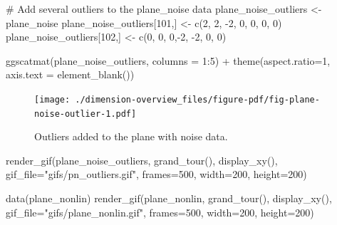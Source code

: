 \documentclass[
  letterpaper,
]{book}
\newenvironment{Shaded}{\begin{snugshade}}{\end{snugshade}}
\newcommand{\AttributeTok}[1]{\textcolor[rgb]{0.40,0.45,0.13}{#1}}
\newcommand{\CommentTok}[1]{\textcolor[rgb]{0.37,0.37,0.37}{#1}}
\newcommand{\DecValTok}[1]{\textcolor[rgb]{0.68,0.00,0.00}{#1}}
\newcommand{\FunctionTok}[1]{\textcolor[rgb]{0.28,0.35,0.67}{#1}}
\newcommand{\NormalTok}[1]{\textcolor[rgb]{0.00,0.23,0.31}{#1}}
\newcommand{\OtherTok}[1]{\textcolor[rgb]{0.00,0.23,0.31}{#1}}
\newcommand{\SpecialCharTok}[1]{\textcolor[rgb]{0.37,0.37,0.37}{#1}}
\newcommand{\StringTok}[1]{\textcolor[rgb]{0.13,0.47,0.30}{#1}}
\begin{document}
\begin{Shaded}
\begin{Highlighting}[]
\CommentTok{\# Add several outliers to the plane\_noise data}
\NormalTok{plane\_noise\_outliers }\OtherTok{\textless{}{-}}\NormalTok{ plane\_noise}
\NormalTok{plane\_noise\_outliers[}\DecValTok{101}\NormalTok{,] }\OtherTok{\textless{}{-}} \FunctionTok{c}\NormalTok{(}\DecValTok{2}\NormalTok{, }\DecValTok{2}\NormalTok{, }\SpecialCharTok{{-}}\DecValTok{2}\NormalTok{, }\DecValTok{0}\NormalTok{, }\DecValTok{0}\NormalTok{, }\DecValTok{0}\NormalTok{, }\DecValTok{0}\NormalTok{)}
\NormalTok{plane\_noise\_outliers[}\DecValTok{102}\NormalTok{,] }\OtherTok{\textless{}{-}} \FunctionTok{c}\NormalTok{(}\DecValTok{0}\NormalTok{, }\DecValTok{0}\NormalTok{, }\DecValTok{0}\NormalTok{,}\SpecialCharTok{{-}}\DecValTok{2}\NormalTok{, }\SpecialCharTok{{-}}\DecValTok{2}\NormalTok{, }\DecValTok{0}\NormalTok{, }\DecValTok{0}\NormalTok{)}

\FunctionTok{ggscatmat}\NormalTok{(plane\_noise\_outliers, }\AttributeTok{columns =} \DecValTok{1}\SpecialCharTok{:}\DecValTok{5}\NormalTok{) }\SpecialCharTok{+}
  \FunctionTok{theme}\NormalTok{(}\AttributeTok{aspect.ratio=}\DecValTok{1}\NormalTok{, }\AttributeTok{axis.text =} \FunctionTok{element\_blank}\NormalTok{())}
\end{Highlighting}
\end{Shaded}

\begin{figure}[H]

{\centering \texttt{[image: ./dimension-overview\_files/figure-pdf/fig-plane-noise-outlier-1.pdf]}

}

\caption{\label{fig-plane-noise-outlier}Outliers added to the plane with
noise data.}

\end{figure}

\begin{Shaded}
\begin{Highlighting}[]
\FunctionTok{render\_gif}\NormalTok{(plane\_noise\_outliers,          }
           \FunctionTok{grand\_tour}\NormalTok{(), }
           \FunctionTok{display\_xy}\NormalTok{(),}
           \AttributeTok{gif\_file=}\StringTok{"gifs/pn\_outliers.gif"}\NormalTok{,}
           \AttributeTok{frames=}\DecValTok{500}\NormalTok{,}
           \AttributeTok{width=}\DecValTok{200}\NormalTok{,}
           \AttributeTok{height=}\DecValTok{200}\NormalTok{)}

\FunctionTok{data}\NormalTok{(plane\_nonlin)}
\FunctionTok{render\_gif}\NormalTok{(plane\_nonlin,          }
           \FunctionTok{grand\_tour}\NormalTok{(), }
           \FunctionTok{display\_xy}\NormalTok{(),}
           \AttributeTok{gif\_file=}\StringTok{"gifs/plane\_nonlin.gif"}\NormalTok{,}
           \AttributeTok{frames=}\DecValTok{500}\NormalTok{,}
           \AttributeTok{width=}\DecValTok{200}\NormalTok{,}
           \AttributeTok{height=}\DecValTok{200}\NormalTok{)}
\end{Highlighting}
\end{Shaded}
\end{document}
